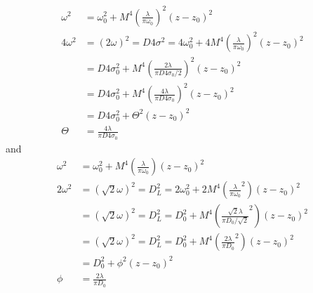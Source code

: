\documentclass[]{article}
\begin{document}
\begin{align}
    \omega^2 &= \omega_0^2 + M^4 \left(\frac{\lambda}{\pi \omega_0}\right)^2 (z-z_0)^2 \\
    4\omega^2 &= (2 \omega)^2 = D4\sigma^2 = 4\omega_0^2 + 4M^4 \left(\frac{\lambda}{\pi \omega_0}\right)^2 (z-z_0)^2 \\
              &= D4\sigma_0^2 + M^4 \left(\frac{2\lambda}{\pi D4\sigma_0 /2}\right)^2 (z-z_0)^2 \\
              &= D4\sigma_0^2 + M^4 \left(\frac{4\lambda}{\pi D4\sigma_0}\right)^2 (z-z_0)^2 \\
              &=  D4\sigma_0^2 + \Theta^2(z-z_0)^2 \\
    \Theta &= \frac{4\lambda}{\pi D4\sigma_0}
\end{align}
and
\begin{align}
    \omega^2 &= \omega_0^2 + M^4 \left(\frac{\lambda}{\pi \omega_0}\right) (z-z_0)^2 \\
    2\omega^2 &= (\sqrt{2}{ \omega})^2  = D_L^2 = 2\omega_0^2 + 2M^4 \left(\frac{\lambda}{\pi \omega_0}^2\right) (z-z_0)^2 \\
              &= (\sqrt{2}{ \omega})^2  = D_L^2 = D_0^2 + M^4 \left(\frac{\sqrt{2}\lambda}{\pi D_0/\sqrt{2}}^2\right) (z-z_0)^2 \\
              &= (\sqrt{2}{ \omega})^2  = D_L^2 = D_0^2 + M^4 \left(\frac{2\lambda}{\pi D_0}^2\right) (z-z_0)^2 \\
              &=  D_0^2 + \phi^2(z-z_0)^2 \\
    \phi &= \frac{2\lambda}{\pi D_0}
\end{align}
\end{document}

